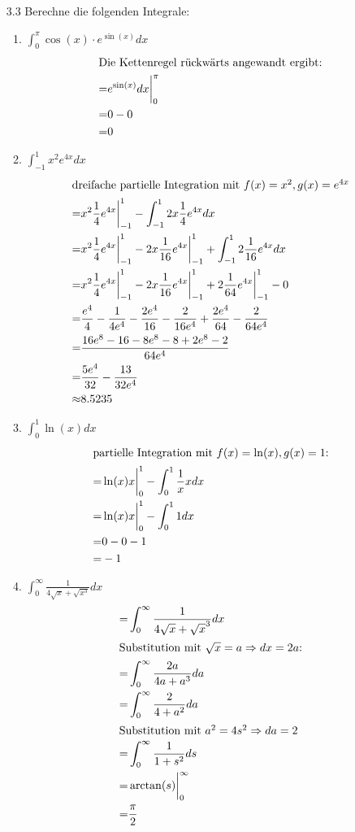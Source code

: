 \documentclass{HM}
\begin{document}
	\begin{enumerate}
		\item[3.3] Berechne die folgenden Integrale:
		\begin{enumerate}
			\item $\int_0^\pi\cos(x)\cdot e^{\sin(x)}dx$
			\begin{align*}
				\intertext{Die Kettenregel rückwärts angewandt ergibt:}
				=&e^{\sin(x)}dx\biggr|_0^\pi\\
				=&0-0\\
				=&0
			\end{align*}
			\item $\int_{-1}^1x^2e^{4x}dx$
			\begin{align*}
				\intertext{dreifache partielle Integration mit $f(x)=x^2, g(x)=e^{4x}$}
				=&x^2\frac{1}{4}e^{4x}\biggr|_{-1}^1 - \int_{-1}^12x\frac{1}{4}e^{4x}dx\\
				=&x^2\frac{1}{4}e^{4x}\biggr|_{-1}^1 - 2x\frac{1}{16}e^{4x}\biggr|_{-1}^1 + \int_{-1}^12\frac{1}{16}e^{4x}dx\\
				=&x^2\frac{1}{4}e^{4x}\biggr|_{-1}^1 - 2x\frac{1}{16}e^{4x}\biggr|_{-1}^1 + 2\frac{1}{64}e^{4x}\biggr|_{-1}^1-0\\
				=&\frac{e^4}{4}-\frac{1}{4e^4}-\frac{2e^4}{16}-\frac{2}{16e^4}+\frac{2e^4}{64}-\frac{2}{64e^4}\\
				=&\frac{16e^8-16-8e^8-8+2e^8-2}{64e^4}	\\
				=&\frac{5e^4}{32}-\frac{13}{32e^4}\\
				\approx& 8.5235
			\end{align*}
			\item $\int_0^1\ln(x)dx$
			\begin{align*}
				\intertext{partielle Integration mit $f(x)=\ln(x), g(x)=1$:}
				=&\ln(x)x\biggr|_0^1 - \int_0^1\frac{1}{x}xdx\\
				=&\ln(x)x\biggr|_0^1 - \int_0^11dx\\
				=&0-0-1\\
				=&-1
			\end{align*}
			\item $\int_0^\infty\frac{1}{4\sqrt{x}+\sqrt{x^3}}dx$
			\begin{align*}
				=&\int_0^\infty\frac{1}{4\sqrt{x}+\sqrt{x}^3}dx\\
				\intertext{Substitution mit $\sqrt{x}=a\Rightarrow dx=2a$:}
				=&\int_0^\infty\frac{2a}{4a+a^3}da\\
				=&\int_0^\infty\frac{2}{4+a^2}da\\
				\intertext{Substitution mit $a^2=4s^2\Rightarrow da=2$}
				=&\int_0^\infty\frac{1}{1+s^2}ds\\
				=&\arctan(s)\biggr|_0^\infty\\
				=&\frac{\pi}{2}
			\end{align*}
		\end{enumerate}
		

\end{enumerate}
\end{document}
